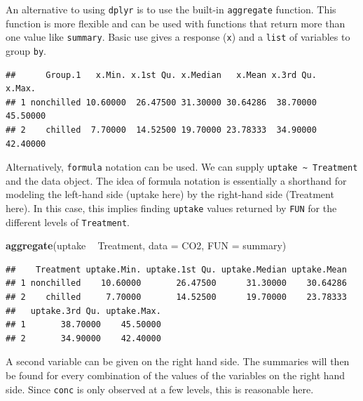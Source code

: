 \documentclass[
]{book}
\newenvironment{Shaded}{\begin{snugshade}}{\end{snugshade}}
\newcommand{\DataTypeTok}[1]{\textcolor[rgb]{0.13,0.29,0.53}{#1}}
\newcommand{\KeywordTok}[1]{\textcolor[rgb]{0.13,0.29,0.53}{\textbf{#1}}}
\newcommand{\NormalTok}[1]{#1}
\newcommand{\OperatorTok}[1]{\textcolor[rgb]{0.81,0.36,0.00}{\textbf{#1}}}
\newcommand{\StringTok}[1]{\textcolor[rgb]{0.31,0.60,0.02}{#1}}
\theoremstyle{definition}
\theoremstyle{definition}
\theoremstyle{definition}
\theoremstyle{remark}
\begin{document}
An alternative to using \texttt{dplyr} is to use the built-in \texttt{aggregate} function. This function is more flexible and can be used with functions that return more than one value like \texttt{summary}. Basic use gives a response (\texttt{x}) and a \texttt{list} of variables to group \texttt{by}.

\begin{Shaded}
\end{Shaded}

\begin{verbatim}
##      Group.1   x.Min. x.1st Qu. x.Median   x.Mean x.3rd Qu.   x.Max.
## 1 nonchilled 10.60000  26.47500 31.30000 30.64286  38.70000 45.50000
## 2    chilled  7.70000  14.52500 19.70000 23.78333  34.90000 42.40000
\end{verbatim}

Alternatively, \texttt{formula} notation can be used. We can supply \texttt{uptake\ \textasciitilde{}\ Treatment} and the data object. The idea of formula notation is essentially a shorthand for modeling the left-hand side (uptake here) by the right-hand side (Treatment here). In this case, this implies finding \texttt{uptake} values returned by \texttt{FUN} for the different levels of \texttt{Treatment}.

\begin{Shaded}
\begin{Highlighting}[]
\KeywordTok{aggregate}\NormalTok{(uptake }\OperatorTok{~}\StringTok{ }\NormalTok{Treatment, }\DataTypeTok{data =}\NormalTok{ CO2, }\DataTypeTok{FUN =}\NormalTok{ summary)}
\end{Highlighting}
\end{Shaded}

\begin{verbatim}
##    Treatment uptake.Min. uptake.1st Qu. uptake.Median uptake.Mean
## 1 nonchilled    10.60000       26.47500      31.30000    30.64286
## 2    chilled     7.70000       14.52500      19.70000    23.78333
##   uptake.3rd Qu. uptake.Max.
## 1       38.70000    45.50000
## 2       34.90000    42.40000
\end{verbatim}

A second variable can be given on the right hand side. The summaries will then be found for every combination of the values of the variables on the right hand side. Since \texttt{conc} is only observed at a few levels, this is reasonable here.
\end{document}

